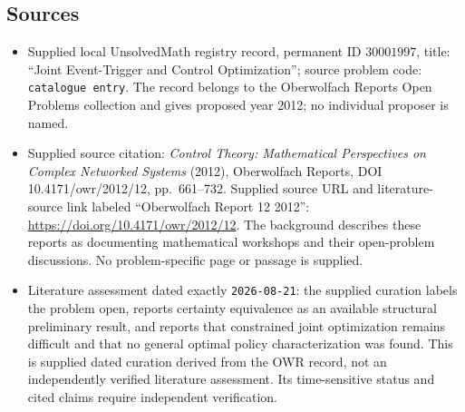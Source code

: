 \documentclass[11pt]{article}
\begin{document}
\subsection{Sources}
\begin{itemize}
\item Supplied local UnsolvedMath registry record, permanent ID \(30001997\), title: ``Joint Event-Trigger and Control Optimization''; source problem code: \texttt{catalogue entry}. The record belongs to the Oberwolfach Reports Open Problems collection and gives proposed year 2012; no individual proposer is named.
\item Supplied source citation: \emph{Control Theory: Mathematical Perspectives on Complex Networked Systems} (2012), Oberwolfach Reports, DOI 10.4171/owr/2012/12, pp.\ 661--732. Supplied source URL and literature-source link labeled ``Oberwolfach Report 12 2012'': \url{https://doi.org/10.4171/owr/2012/12}. The background describes these reports as documenting mathematical workshops and their open-problem discussions. No problem-specific page or passage is supplied.
\item Literature assessment dated exactly \texttt{2026-08-21}: the supplied curation labels the problem open, reports certainty equivalence as an available structural preliminary result, and reports that constrained joint optimization remains difficult and that no general optimal policy characterization was found. This is supplied dated curation derived from the OWR record, not an independently verified literature assessment. Its time-sensitive status and cited claims require independent verification.
\end{itemize}
\end{document}
